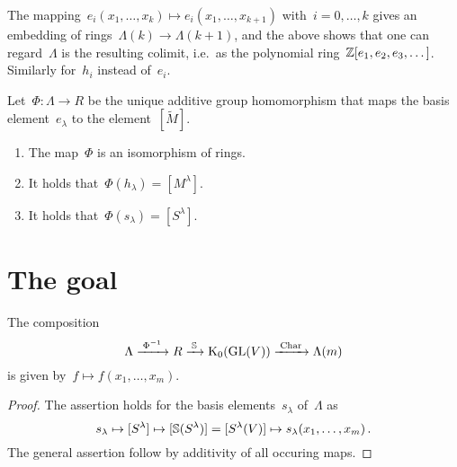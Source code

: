 \documentclass[a4paper,10pt]{scrartcl}
\begin{document}
The mapping~$e_i(x_1, \dotsc, x_k) \mapsto e_i(x_1, \dotsc, x_{k+1})$ with~$i = 0, \dotsc, k$ gives an embedding of rings~$\Lambda(k) \to \Lambda(k+1)$, and the above shows that one can regard~$\Lambda$ is the resulting colimit, i.e.\ as the polynomial ring~$\mathbb{Z}[e_1, e_2, e_3, \dotsc]$.
Similarly for~$h_i$ instead of~$e_i$.

\begin{theorem}
  Let~$\Phi \colon \Lambda \to R$ be the unique additive group homomorphism that maps the basis element~$e_\lambda$ to the element~$[\widetilde{M}]$.
  \begin{enumerate}
    \item
      The map~$\Phi$ is an isomorphism of rings.
    \item
      It holds that~$\Phi(h_\lambda) = [M^\lambda]$.
    \item
      It holds that~$\Phi(s_\lambda) = [S^\lambda]$.
  \end{enumerate}
\end{theorem}





\section{The goal}

\begin{corollary}
  The composition
  \[
    \Lambda
    \xrightarrow{\;\Phi^{-1}\;}
    R
    \xrightarrow{\;\mathbb{S}\;}
    \operatorname{K}_0(\operatorname{GL}(V))
    \xrightarrow{\;\operatorname{Char}\;}
    \Lambda(m)
  \]
  is given by~$f \mapsto f(x_1, \dotsc, x_m)$.
\end{corollary}

\begin{proof}
  The assertion holds for the basis elements~$s_\lambda$ of~$\Lambda$ as
  \[
    s_\lambda
    \mapsto
    [S^\lambda]
    \mapsto
    [\mathbb{S}(S^\lambda)]
    =
    [S^\lambda(V)]
    \mapsto
    s_\lambda(x_1, \dotsc, x_m) \,.
  \]
  The general assertion follow by additivity of all occuring maps.
\end{proof}
\end{document}
